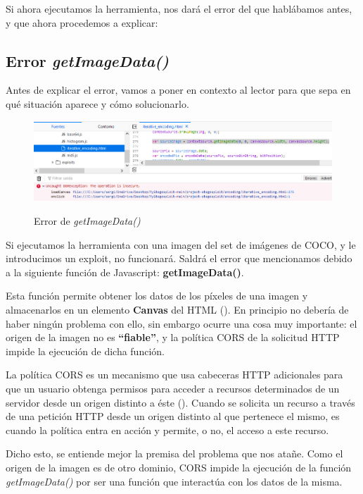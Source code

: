 Si ahora ejecutamos la herramienta, nos dará el error del que hablábamos antes, y que ahora procedemos a explicar:

\subsection{Error \textit{getImageData()}}

Antes de explicar el error, vamos a poner en contexto al lector para que sepa en qué situación aparece y cómo solucionarlo.

\begin{figure}[H]
  \centering
  \includegraphics[width=\linewidth]{Figuras/Implementacion/getimagedata.png}
  \label{fig:getimagedata}
  \caption{Error de \textit{getImageData()}}
\end{figure}

Si ejecutamos la herramienta con una imagen del set de imágenes de COCO, y le introducimos un exploit, no funcionará. Saldrá el error que mencionamos debido a la siguiente función de Javascript: \textbf{getImageData()}.

Esta función permite obtener los datos de los píxeles de una imagen y almacenarlos en un elemento \textbf{Canvas} del HTML (\cite{getimagedata}). En principio no debería de haber ningún problema con ello, sin embargo ocurre una cosa muy importante: el origen de la imagen no es \textbf{``fiable''}, y la política \ac{CORS} de la solicitud HTTP impide la ejecución de dicha función. %

La política \ac{CORS} es un mecanismo que usa cabeceras HTTP adicionales para que un usuario obtenga permisos para acceder a recursos determinados de un servidor desde un origen distinto a éste (\cite{CORS}). Cuando se solicita un recurso a través de una petición HTTP desde un origen distinto al que pertenece el mismo, es cuando la política entra en acción y permite, o no, el acceso a este recurso. %

Dicho esto, se entiende mejor la premisa del problema que nos atañe. Como el origen de la imagen es de otro dominio, \ac{CORS} impide la ejecución de la función \textit{getImageData()} por ser una función que interactúa con los datos de la misma.

